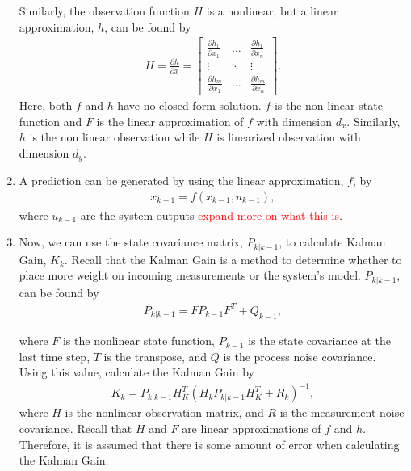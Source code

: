 \begin{enumerate}
  
  Similarly, the observation function $H$ is a nonlinear, but a linear approximation, $h$, can be found by
  \begin{align*}
      H = \frac{\partial h}{\partial x} =
     \begin{bmatrix}
           \frac{\partial h_1}{\partial x_1} & \hdots & \frac{\partial h_1}{\partial x_n} \\
           \vdots & \ddots & \vdots \\
           \frac{\partial h_m}{\partial x_1}  & \hdots & \frac{\partial h_{m}}{\partial x_n}
         \end{bmatrix}  .
  \end{align*}
   Here, both $f$ and $h$ have no closed form solution. $f$ is the non-linear state function and $F$ is the linear approximation of $f$ with dimension $d_x$. Similarly, $h$ is the non linear observation while $H$ is linearized observation with dimension $d_y$. 
   
   
   
  \item A prediction can be generated by using the linear approximation, $f$, by
  \begin{align*}
      x_{k+1} = f( x_{k-1} , u_{k-1})  ,
  \end{align*} 
  where $u_{k-1}$ are the system outputs \textcolor{red}{expand more on what this is}. 
  
  
  
  \item Now, we can use the state covariance matrix, $P_{k | k - 1}$, to calculate Kalman Gain, $K_k$.  Recall that the Kalman Gain is a method to determine whether to place more weight on incoming measurements or the system's model. $P_{k | k - 1}$, can be found by
    \begin{align*} 
        P_{k | k -1} = F P_{k - 1} F^T + Q_{k-1} ,
        \end{align*}
        
       where $F$ is the nonlinear state function, $P_{k - 1} $ is the state covariance at the last time step, $T$ is the transpose, and $Q$ is the process noise covariance. Using this value, calculate the Kalman Gain by
         \begin{align*} 
        K_k = P_{k | k - 1} H^T_K (H_k P_{k | k - 1} H^T_K + R_k)^{-1},
    \end{align*}
    where $H$ is the nonlinear observation matrix, and $R$ is the measurement noise covariance.
    Recall that $H$ and $F$ are linear approximations of $f$ and $h$. Therefore, it is assumed that there is some amount of error when calculating the Kalman Gain.
    

\end{enumerate}
